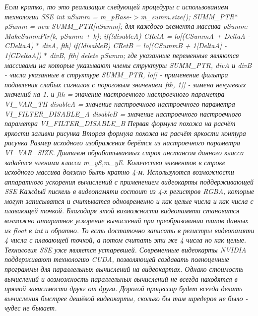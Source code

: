 \begin{DoxyCompactItemize}
\begin{DoxyCompactList}\small\item\em Если кратко, то это реализация следующей процедуры с использованием технологии S\+S\+E int n\+Summ = m\+\_\+p\+Base-\/$>$m\+\_\+summ.\+size(); S\+U\+M\+M\+\_\+\+P\+T\+R$\ast$ p\+Summ = new S\+U\+M\+M\+\_\+\+P\+T\+R\mbox{[}n\+Summ\mbox{]}; для каждого элемента массива p\+Summ\+: Make\+Summ\+Ptr(k, p\+Summ + k); if(!disable\+A) C\+Ret\+A = lo\mbox{[}(C\+Summ\+A + Delta\+A -\/ C\+Delta\+A) $\ast$ div\+A, fth\mbox{]} if(!disable\+B) C\+Ret\+B = lo\mbox{[}(C\+Summ\+B + 1\mbox{[}Delta\+A\mbox{]} -\/ 1\mbox{[}C\+Delta\+A\mbox{]}) $\ast$ div\+B, fth\mbox{]} delete p\+Summ; где указанные переменные являются массивами на которые указывают члены структуры S\+U\+M\+M\+\_\+\+P\+T\+R, div\+A и div\+B -\/ числа указанные в структуре S\+U\+M\+M\+\_\+\+P\+T\+R, lo\mbox{[}\mbox{]} -\/ применение фильтра подавления слабых сигналов с пороговым значением fth, 1\mbox{[}\mbox{]} -\/ замена ненулевых значений на 1. и fth = значение настроечного настроечного параметра V\+I\+\_\+\+V\+A\+R\+\_\+\+T\+H disable\+A = значение настроечного настроечного параметра V\+I\+\_\+\+F\+I\+L\+T\+E\+R\+\_\+\+D\+I\+S\+A\+B\+L\+E\+\_\+\+A disable\+B = значение настроечного настроечного параметра V\+I\+\_\+\+F\+I\+L\+T\+E\+R\+\_\+\+D\+I\+S\+A\+B\+L\+E\+\_\+\+B Первая формула похожа на расчёт яркости заливки рисунка Вторая формула похожа на расчёт яркости контура рисунка Размер исходного изображения берётся из настроечного параметра V\+I\+\_\+\+V\+A\+R\+\_\+\+S\+I\+Z\+E. Диапазон обрабатываемых строк инстансом данного класса задаётся членами класса m\+\_\+y\+S,m\+\_\+y\+E. Количество элементов в строке исходного массива должно быть кратно 4-\/м. Используются возможности аппаратного ускорения вычислений с применением видеокарты поддерживающей S\+S\+E Каждый пискель в видеопамяти состоит из 4-\/х регистров R\+G\+B\+A, которые могут записыватся и считыватся одновременно и как целые числа и как числа с плавающей точкой. Благодаря этой возможности видеопамяти становится возможно аппаратное ускорение вычислений при преобразовании типов данных из float в int и обратно. То есть достаточно записать в регистры видеопамяти 4 числа с плавающей точкой, а потом считать эти же 4 числа но как целые. Технология S\+S\+E уже является устаревшей. Современные видеокарты N\+V\+I\+D\+I\+A поддерживают технологию C\+U\+D\+A, позволяющей создавать полноценные программы для параллельных вычислений на видеокартах. Однако стоимость вычислений и возможность параллельных вычислений не всегда находятся в прямой зависимости друкг от друга. Дорогой процессор будет всегда делать вычисления быстрее дешёвой видеокарты, сколько бы там шредеров не было -\/ чудес не бывает. \end{DoxyCompactList}\item 

\end{DoxyCompactItemize}
